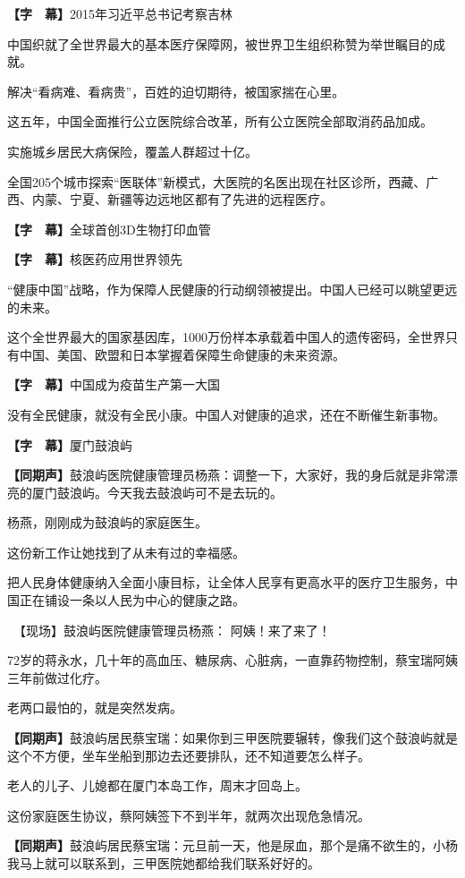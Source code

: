 \documentclass{ctexart}
\newcommand{\zkh}[1]{\textbf{\hspace{-2.7em} 【#1】}}
\begin{document}
 \zkh{字　幕}2015年习近平总书记考察吉林

 中国织就了全世界最大的基本医疗保障网，被世界卫生组织称赞为举世瞩目的成就。

 解决``看病难、看病贵''，百姓的迫切期待，被国家揣在心里。

 这五年，中国全面推行公立医院综合改革，所有公立医院全部取消药品加成。

 实施城乡居民大病保险，覆盖人群超过十亿。

全国205个城市探索``医联体''新模式，大医院的名医出现在社区诊所，西藏、广西、内蒙、宁夏、新疆等边远地区都有了先进的远程医疗。

 \zkh{字　幕}全球首创3D生物打印血管

 \zkh{字　幕}核医药应用世界领先

 
``健康中国''战略，作为保障人民健康的行动纲领被提出。中国人已经可以眺望更远的未来。

这个全世界最大的国家基因库，1000万份样本承载着中国人的遗传密码，全世界只有中国、美国、欧盟和日本掌握着保障生命健康的未来资源。

 \zkh{字　幕}中国成为疫苗生产第一大国

 
没有全民健康，就没有全民小康。中国人对健康的追求，还在不断催生新事物。

 \zkh{字　幕}厦门鼓浪屿

 \zkh{同期声}鼓浪屿医院健康管理员杨燕：调整一下，大家好，我的身后就是非常漂亮的厦门鼓浪屿。今天我去鼓浪屿可不是去玩的。

 杨燕，刚刚成为鼓浪屿的家庭医生。

 这份新工作让她找到了从未有过的幸福感。

把人民身体健康纳入全面小康目标，让全体人民享有更高水平的医疗卫生服务，中国正在铺设一条以人民为中心的健康之路。

 　【现场】鼓浪屿医院健康管理员杨燕： 阿姨！来了来了！

 
72岁的蒋永水，几十年的高血压、糖尿病、心脏病，一直靠药物控制，蔡宝瑞阿姨三年前做过化疗。

 老两口最怕的，就是突然发病。

 \zkh{同期声}鼓浪屿居民蔡宝瑞：如果你到三甲医院要辗转，像我们这个鼓浪屿就是这个不方便，坐车坐船到那边去还要排队，还不知道要怎么样子。

 老人的儿子、儿媳都在厦门本岛工作，周末才回岛上。

 这份家庭医生协议，蔡阿姨签下不到半年，就两次出现危急情况。

 \zkh{同期声}鼓浪屿居民蔡宝瑞：元旦前一天，他是尿血，那个是痛不欲生的，小杨我马上就可以联系到，三甲医院她都给我们联系好好的。
\end{document}

